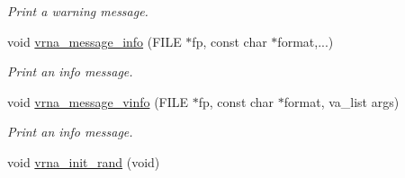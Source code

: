 \begin{DoxyCompactItemize}
\begin{DoxyCompactList}\small\item\em Print a warning message. \end{DoxyCompactList}\item 
void \hyperlink{group__utils_ga039bae6153a6415b054dbe6045f83d03}{vrna\+\_\+message\+\_\+info} (F\+I\+LE $\ast$fp, const char $\ast$format,...)
\begin{DoxyCompactList}\small\item\em Print an info message. \end{DoxyCompactList}\item 
void \hyperlink{group__utils_gad8b8139bd04fbfb51e398e9fcd6908dc}{vrna\+\_\+message\+\_\+vinfo} (F\+I\+LE $\ast$fp, const char $\ast$format, va\+\_\+list args)
\begin{DoxyCompactList}\small\item\em Print an info message. \end{DoxyCompactList}\item 
void \hyperlink{group__utils_ga0ad1f40ea316e5c5918695c35613027a}{vrna\+\_\+init\+\_\+rand} (void)\hypertarget{group__utils_ga0ad1f40ea316e5c5918695c35613027a}{}\label{group__utils_ga0ad1f40ea316e5c5918695c35613027a}


\end{DoxyCompactItemize}

